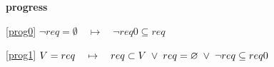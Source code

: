 \textbf{progress}
\begin{block}
\item[ \eqref{prog0} ]{$\neg req = \emptyset \quad \mapsto\quad \neg req0 \subseteq req$} %
\item[ \eqref{prog1} ]{$V = req \quad \mapsto\quad req \subset V  %
      \1\lor req = \emptyset \1\lor \neg req \subseteq req0$} %
\end{block}
